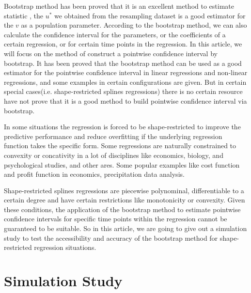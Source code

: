 \documentclass[12pt]{article}
\begin{document}
Bootstrap method has been proved that it is an excellent method to estimate statistic \cite{efron1979bootstrap}, the \(u^*\) we obtained from the resampling dataset is a good estimator for the \(v\) as a population parameter. According to the bootstrap method, we can also calculate the confidence interval for the parameters, or the coefficients of a certain regression, or for certain time points in the regression. In this article, we will focus on the method of construct a pointwise confidence interval by bootstrap. It has been proved that the bootstrap method can be used as a good estimator for the pointwise confidence interval in linear regressions and non-linear regressions\cite{efron1979bootstrap}\cite{davidson1999bootstrap}, and some examples in certain configurations are given.\cite{ruhe2019bootstrap}\cite{ma2019inference}\cite{dugas2010pointwise} But in certain special cases(i.e. shape-restricted splines regressions) there is no certain resource have not prove that it is a good method to build pointwise confidence interval via bootstrap.

In some situations the regression is forced to be shape-restricted to improve the predictive performance and reduce overfitting if the underlying regression function takes the specific form. Some regressions are naturally constrained to convexity or concativity in a lot of disciplines like economics, biology, and psychological studies, and other ares.\cite{jieying2022heteroscedastic} \cite{guntuboyina2018nonparametric} Some popular examples like cost function and profit function in economics\cite{gallant1984imposing}, precipitation data analysis\cite{molitor2002bayesian}.

Shape-restricted splines regressions are piecewise polynominal, differentiable to a certain degree and have certain restrictions like monotonicity or convexity.\cite{meyer2008inference} Given these conditions, the application of the bootstrap method to estimate pointwise confidence intervals for specific time points within the regression cannot be guaranteed to be suitable. So in this article, we are going to give out a simulation study to test the accessibility and accuracy of the bootstrap method for shape-restricted regression situations.









\section{Simulation Study}
\label{Simulation Study}
\end{document}
